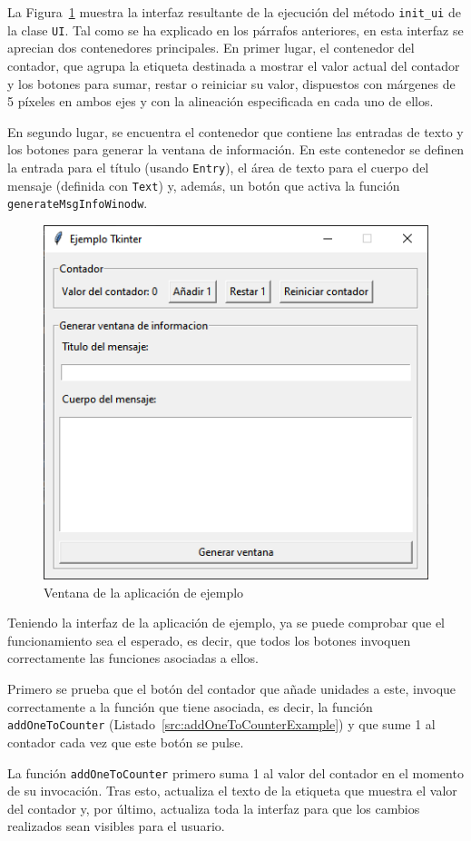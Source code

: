 La Figura~\ref{fig:principalWindowExample} muestra la interfaz resultante de la ejecución del método \texttt{init\_ui} de la clase \texttt{UI}. Tal como se ha explicado en los párrafos anteriores, en esta interfaz se aprecian dos contenedores principales. En primer lugar, el contenedor del contador, que agrupa la etiqueta destinada a mostrar el valor actual del contador y los botones para sumar, restar o reiniciar su valor, dispuestos con márgenes de 5 píxeles en ambos ejes y con la alineación especificada en cada uno de ellos.

En segundo lugar, se encuentra el contenedor que contiene las entradas de texto y los botones para generar la ventana de información. En este contenedor se definen la entrada para el título (usando \texttt{Entry}), el área de texto para el cuerpo del mensaje (definida con \texttt{Text}) y, además, un botón que activa la función \texttt{generateMsgInfoWinodw}.

\begin{figure}[H]
    \centering
    \includegraphics[width=0.6\linewidth]{fig/Ejemplo Tkinter/ventana principal.png}
    \caption{Ventana de la aplicación de ejemplo}
    \label{fig:principalWindowExample}
\end{figure}

Teniendo la interfaz de la aplicación de ejemplo, ya se puede comprobar que el funcionamiento sea el esperado, es decir, que todos los botones invoquen correctamente las funciones asociadas a ellos.

Primero se prueba que el botón del contador que añade unidades a este, invoque correctamente a la función que tiene asociada, es decir, la función \texttt{addOneToCounter} (Listado~\ref{src:addOneToCounterExample}) y que sume 1 al contador cada vez que este botón se pulse.

La función \texttt{addOneToCounter} primero suma 1 al valor del contador en el momento de su invocación. Tras esto, actualiza el texto de la etiqueta que muestra el valor del contador y, por último, actualiza toda la interfaz para que los cambios realizados sean visibles para el usuario.

